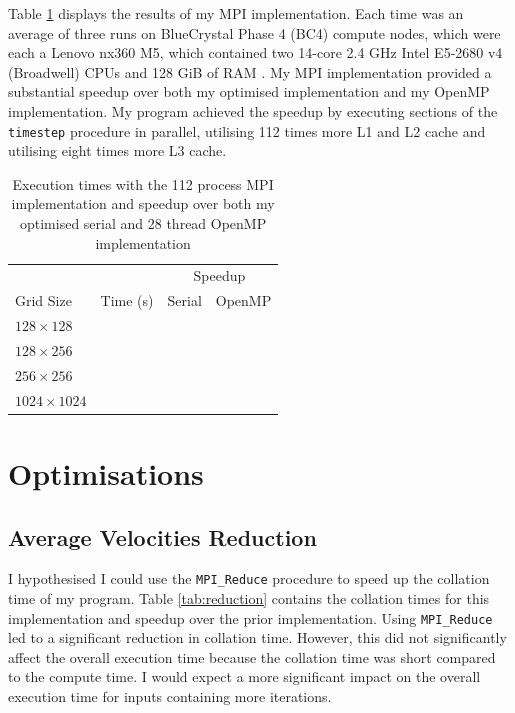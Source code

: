 \documentclass[twocolumn, a4paper]{article}
\begin{document}
Table \ref{tab:mpi} displays the results of my MPI implementation.
Each time was an average of three runs on BlueCrystal Phase 4 (BC4) compute nodes, which were each a Lenovo nx360 M5, which contained two 14-core 2.4 GHz Intel E5-2680 v4 (Broadwell) CPUs and 128 GiB of RAM \cite{bcp4}.
My MPI implementation provided a substantial speedup over both my optimised  implementation and my OpenMP implementation.
My program achieved the speedup by executing sections of the \texttt{timestep} procedure in parallel, utilising 112 times more L1 and L2 cache and utilising eight times more L3 cache.

\begin{table}[htbp]
  \begin{center}
  \caption{Execution times with the 112 process MPI implementation and speedup over both my optimised serial and 28 thread OpenMP implementation}\label{tab:mpi}
  \begin{tabular}[t]{l | l  l  l} 
      \hline\hline
      &&\multicolumn{2}{c}{Speedup}\\
      \cline{3-4}
      Grid Size&Time (s)&Serial&OpenMP\\
      \hline
      $128 \times 128$&\texttt{}&\texttt{}&\texttt{}\\
      $128 \times 256$&\texttt{}&\texttt{}&\texttt{}\\
      $256 \times 256$&\texttt{}&\texttt{}&\texttt{}\\
      $1024 \times 1024$&\texttt{}&\texttt{}&\texttt{}\\
      \hline
    \end{tabular}
  \end{center}
\end{table}

\section{Optimisations}

\subsection{Average Velocities Reduction}

I hypothesised I could use the \texttt{MPI\_Reduce} procedure to speed up the collation time of my program.
Table \ref{tab:reduction} contains the collation times for this implementation and speedup over the prior implementation.
Using \texttt{MPI\_Reduce} led to a significant reduction in collation time.
However, this did not significantly affect the overall execution time because the collation time was short compared to the compute time.
I would expect a more significant impact on the overall execution time for inputs containing more iterations.
\end{document}
